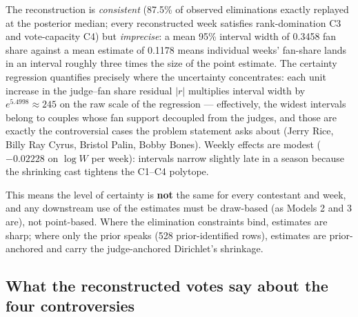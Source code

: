 The reconstruction is \emph{consistent} (87.5\% of observed eliminations exactly
replayed at the posterior median; every reconstructed week satisfies rank-domination
C3 and vote-capacity C4) but \emph{imprecise}: a mean 95\% interval width of 0.3458
fan share against a mean estimate of 0.1178 means individual weeks' fan-share lands
in an interval roughly three times the size of the point estimate. The certainty
regression quantifies precisely where the uncertainty concentrates: each unit increase
in the judge--fan share residual $|r|$ multiplies interval width by
$e^{5.4998} \approx 245$ on the raw scale of the regression --- effectively, the
widest intervals belong to couples whose fan support decoupled from the judges, and
those are exactly the controversial cases the problem statement asks about (Jerry
Rice, Billy Ray Cyrus, Bristol Palin, Bobby Bones). Weekly effects are modest
($-0.02228$ on $\log W$ per week): intervals narrow slightly late in a season
because the shrinking cast tightens the C1--C4 polytope.

This means the level of certainty is \textbf{not} the same for every contestant and
week, and any downstream use of the estimates must be draw-based (as Models 2 and 3
are), not point-based. Where the elimination constraints bind, estimates are sharp;
where only the prior speaks (528 prior-identified rows), estimates are
prior-anchored and carry the judge-anchored Dirichlet's shrinkage.

\subsection{What the reconstructed votes say about the four controversies}

